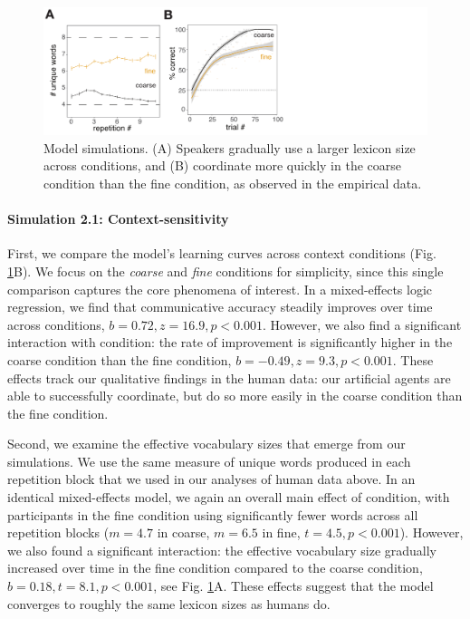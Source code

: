 \begin{figure}[t]
\begin{center}
\includegraphics[scale=0.6]{./figures/sec2-modelFig.pdf}
\vspace{-1ex}
{\caption{{Model simulations. (A) Speakers gradually use a larger lexicon size across conditions, and (B) coordinate more quickly in the coarse condition than the fine condition, as observed in the empirical data.}  \label{fig:sec2model}}}
\end{center}
\vspace{-3ex}
\end{figure}


\paragraph{Simulation 2.1: Context-sensitivity}

First, we compare the model's learning curves across context conditions (Fig. \ref{fig:sec2model}B). 
We focus on the \emph{coarse} and \emph{fine} conditions for simplicity, since this single comparison captures the core phenomena of interest.
In a mixed-effects logic regression, we find that communicative accuracy steadily improves over time across conditions, $b=0.72, z = 16.9, p<0.001$.
However, we also find a significant interaction with condition: the rate of improvement is significantly higher in the coarse condition than the fine condition, $b=-0.49, z=9.3, p <0.001$. 
These effects track our qualitative findings in the human data: our artificial agents are able to successfully coordinate, but do so more easily in the coarse condition than the fine condition. 

Second, we examine the effective vocabulary sizes that emerge from our simulations. 
We use the same measure of unique words produced in each repetition block that we used in our analyses of human data above. 
In an identical mixed-effects model, we again an overall main effect of condition, with participants in the fine condition using significantly fewer words across all repetition blocks ($m = 4.7$ in coarse, $m=6.5$ in fine, $t = 4.5, p < 0.001$).
However, we also found a significant interaction: the effective vocabulary size gradually increased over time in the fine condition compared to the coarse condition, $b = 0.18, t = 8.1, p < 0.001$, see Fig. \ref{fig:sec2model}A.
These effects suggest that the model converges to roughly the same lexicon sizes as humans do.

